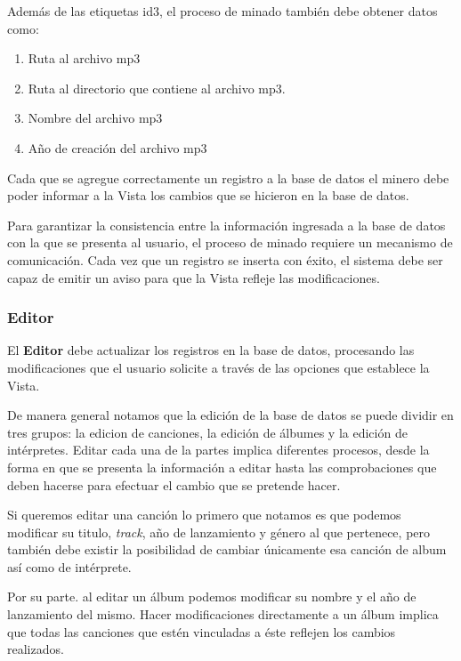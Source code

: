 \documentclass{rep}
\begin{document}
    Además de las etiquetas id3, el proceso de minado también debe
    obtener datos como:
    
    \begin{enumerate}
    \item Ruta al archivo mp3
    \item Ruta al directorio que contiene al archivo mp3.
    \item Nombre del archivo mp3
    \item Año de creación del archivo mp3
    \end{enumerate}

    Cada que se agregue correctamente un registro a la base de datos
    el minero debe poder informar a la Vista los cambios que se
    hicieron en la base de datos.

    Para garantizar la consistencia entre la información ingresada a
    la base de datos con la que se presenta al usuario, el proceso de
    minado requiere un mecanismo de comunicación. Cada vez que un
    registro se inserta con éxito, el sistema debe ser capaz de emitir
    un aviso para que la Vista refleje las modificaciones. 
    
    \subsubsection{Editor}

    El \textbf{Editor} debe actualizar los registros en la base de
    datos, procesando las modificaciones que el usuario solicite a
    través de las opciones que establece la Vista.
    
    De manera general notamos que la edición de la base de datos se
    puede dividir en tres grupos: la edicion de canciones, la edición
    de álbumes y la edición de intérpretes. Editar cada una de la
    partes implica diferentes procesos, desde la forma en que se
    presenta la información a editar hasta las comprobaciones que
    deben hacerse para efectuar el cambio que se pretende hacer. 

    Si queremos editar una canción lo primero que notamos es que
    podemos modificar su titulo, \textit{track}, año de lanzamiento y
    género al que pertenece, pero también debe existir la posibilidad
    de cambiar únicamente esa canción de album así como de intérprete.

    Por su parte. al editar un álbum podemos modificar su nombre y el
    año de lanzamiento del mismo. Hacer modificaciones directamente a
    un álbum implica que todas las canciones que estén vinculadas a
    éste reflejen los cambios realizados.
\end{document}
